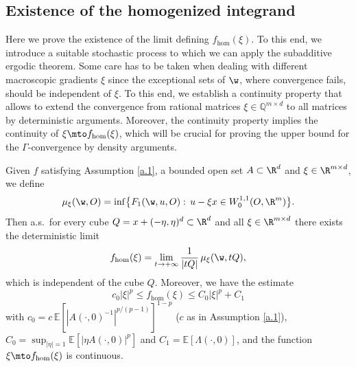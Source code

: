 \subsection{Existence of the homogenized integrand}
Here we prove the existence of the limit defining $f_{\hom}(\xi)$. To this end, we introduce a suitable stochastic process to which we can apply the subadditive ergodic theorem. Some care has to be taken when dealing with different macroscopic gradients $\xi$ since the exceptional sets of $\w$, where convergence fails, should be independent of $\xi$. To this end, we establish a continuity property that allows to extend the convergence from rational matrices $\xi\in\mathbb{Q}^{m\times d}$ to all matrices by deterministic arguments. Moreover, the continuity property implies the continuity of $\xi\mto f_{\hom}(\xi)$, which will be crucial for proving the upper bound for the $\Gamma$-convergence by density arguments.
\begin{lemma}\label{l.existence_f_hom}
Given $f$ satisfying Assumption \ref{a.1}, a bounded open set $A\subset\R^d$ and $\xi\in\R^{m\times d}$, we define
\begin{equation*}
\mu_{\xi}(\w,O)=\inf\bigl\{F_1(\w,u,O):\,u-\xi x\in W^{1,1}_{0}(O,\R^m)\bigr\}.
\end{equation*}
Then a.s.\ for every cube $Q=x+(-\eta,\eta)^d\subset\R^d$ and all $\xi\in\R^{m\times d}$ there exists the deterministic limit
\begin{equation*}
f_{\hom}(\xi)=\lim_{t\to +\infty}\frac{1}{|tQ|}\,\mu_{\xi}(\w,tQ),
\end{equation*}
which is independent of the cube $Q$. Moreover, we have the estimate
\begin{equation*}
c_0|\xi|^p\leq f_{\hom}(\xi)\leq C_0|\xi|^p+C_1
\end{equation*}
with $c_0=c\,\mathbb{E}[|A(\cdot,0)^{-1}|^{p/(p-1)}]^{1-p}$ ($c$ as in Assumption \ref{a.1}), $C_0\!=\!\sup_{|\eta|=1}\mathbb{E}[|\eta A(\cdot,0)|^p]$ and $C_1=\mathbb{E}[\Lambda(\cdot,0)]$, and the function $\xi\mto f_{\hom}(\xi)$ is continuous.
\end{lemma}
